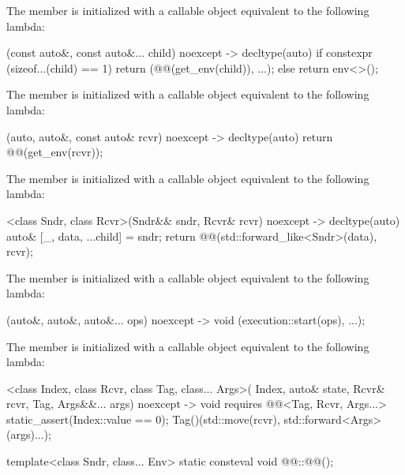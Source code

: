 \pnum
The member 
is initialized with a callable object equivalent to the following lambda:
\begin{codeblock}
[](const auto&, const auto&... child) noexcept -> decltype(auto) {
  if constexpr (sizeof...(child) == 1)
    return (@@(get_env(child)), ...);
  else
    return env<>();
}
\end{codeblock}

\pnum
The member 
is initialized with a callable object equivalent to the following lambda:
\begin{codeblock}
[](auto, auto&, const auto& rcvr) noexcept -> decltype(auto) {
  return @@(get_env(rcvr));
}
\end{codeblock}

\pnum
The member 
is initialized with a callable object equivalent to the following lambda:
\begin{codeblock}
[]<class Sndr, class Rcvr>(Sndr&& sndr, Rcvr& rcvr) noexcept -> decltype(auto) {
  auto& [_, data, ...child] = sndr;
  return @@(std::forward_like<Sndr>(data), rcvr);
}
\end{codeblock}

\pnum
The member 
is initialized with a callable object equivalent to the following lambda:
\begin{codeblock}
[](auto&, auto&, auto&... ops) noexcept -> void {
  (execution::start(ops), ...);
}
\end{codeblock}

\pnum
The member 
is initialized with a callable object equivalent to the following lambda:
\begin{codeblock}
[]<class Index, class Rcvr, class Tag, class... Args>(
  Index, auto& state, Rcvr& rcvr, Tag, Args&&... args) noexcept
    -> void requires @@<Tag, Rcvr, Args...> {
  static_assert(Index::value == 0);
  Tag()(std::move(rcvr), std::forward<Args>(args)...);
}
\end{codeblock}

%
\begin{itemdecl}
template<class Sndr, class... Env>
  static consteval void @@::@@();
\end{itemdecl}

